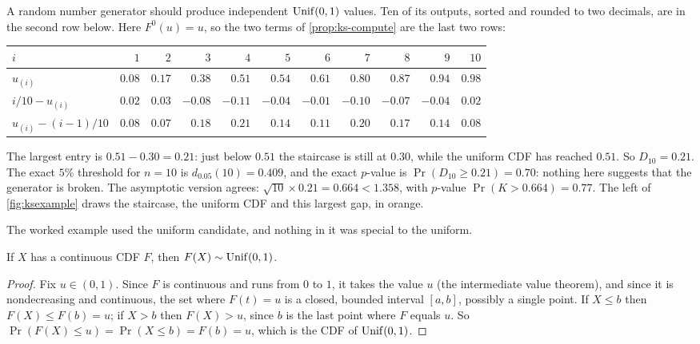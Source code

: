 \begin{worked}
A random number generator should produce independent $\mathrm{Unif}(0, 1)$ values.
Ten of its outputs, sorted and rounded to two decimals, are in the second row below. Here $F^0(u) = u$, so the two terms of \cref{prop:ks-compute} are the last two rows:
\begin{center}
\small
\begin{tabular}{@{}lrrrrrrrrrr@{}}
\toprule
$i$ & $1$ & $2$ & $3$ & $4$ & $5$ & $6$ & $7$ & $8$ & $9$ & $10$ \\
\midrule
$u_{(i)}$ & $0.08$ & $0.17$ & $0.38$ & $0.51$ & $0.54$ & $0.61$ & $0.80$ & $0.87$ & $0.94$ & $0.98$ \\
$i/10 - u_{(i)}$ & $0.02$ & $0.03$ & $-0.08$ & $-0.11$ & $-0.04$ & $-0.01$ & $-0.10$ & $-0.07$ & $-0.04$ & $0.02$ \\
$u_{(i)} - (i-1)/10$ & $0.08$ & $0.07$ & $0.18$ & $0.21$ & $0.14$ & $0.11$ & $0.20$ & $0.17$ & $0.14$ & $0.08$ \\
\bottomrule
\end{tabular}
\end{center}
The largest entry is $0.51 - 0.30 = 0.21$: just below $0.51$ the staircase is still at $0.30$, while the uniform CDF has reached $0.51$.
So $D_{10} = 0.21$.
The exact $5\%$ threshold for $n = 10$ is $d_{0.05}(10) = 0.409$, and the exact $p$-value is $\Pr(D_{10} \geq 0.21) = 0.70$: nothing here suggests that the generator is broken.
The asymptotic version agrees: $\sqrt{10} \times 0.21 = 0.664 < 1.358$, with $p$-value $\Pr(K > 0.664) = 0.77$.
The left of \cref{fig:ksexample} draws the staircase, the uniform CDF and this largest gap, in orange.
\end{worked}

The worked example used the uniform candidate, and nothing in it was special to the uniform.

\begin{lemma}
\label{lem:pit}
If $X$ has a continuous CDF $F$, then $F(X) \sim \mathrm{Unif}(0, 1)$.
\end{lemma}

\begin{proof}
Fix $u \in (0, 1)$.
Since $F$ is continuous and runs from $0$ to $1$, it takes the value $u$ (the intermediate value theorem), and since it is nondecreasing and continuous, the set where $F(t) = u$ is a closed, bounded interval $[a, b]$, possibly a single point.
If $X \leq b$ then $F(X) \leq F(b) = u$; if $X > b$ then $F(X) > u$, since $b$ is the last point where $F$ equals $u$.
So $\Pr(F(X) \leq u) = \Pr(X \leq b) = F(b) = u$, which is the CDF of $\mathrm{Unif}(0, 1)$.
\end{proof}

